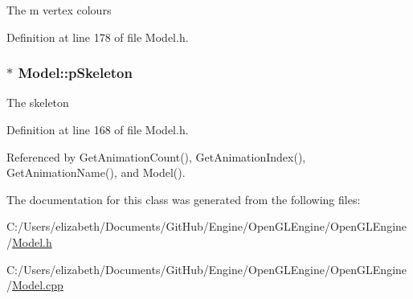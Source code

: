 The m vertex colours 



Definition at line 178 of file Model.\+h.

\subsubsection[{\texorpdfstring{p\+Skeleton}{pSkeleton}}]{$\ast$ Model\+::p\+Skeleton\hspace{0.3cm}{\ttfamily [private]}}\hypertarget{class_model_a2318827a9c98ccd63bfbbb0f3ac84b8a}{}\label{class_model_a2318827a9c98ccd63bfbbb0f3ac84b8a}


The skeleton 



Definition at line 168 of file Model.\+h.



Referenced by Get\+Animation\+Count(), Get\+Animation\+Index(), Get\+Animation\+Name(), and Model().



The documentation for this class was generated from the following files\+:\begin{DoxyCompactItemize}
\item 
C\+:/\+Users/elizabeth/\+Documents/\+Git\+Hub/\+Engine/\+Open\+G\+L\+Engine/\+Open\+G\+L\+Engine/\hyperlink{_model_8h}{Model.\+h}\item 
C\+:/\+Users/elizabeth/\+Documents/\+Git\+Hub/\+Engine/\+Open\+G\+L\+Engine/\+Open\+G\+L\+Engine/\hyperlink{_model_8cpp}{Model.\+cpp}\end{DoxyCompactItemize}
